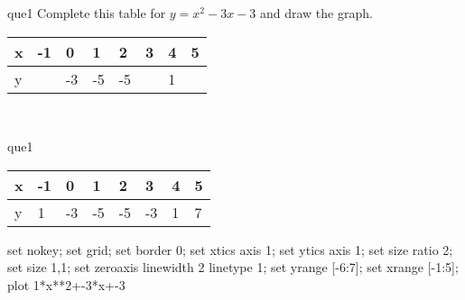 \documentclass[13.5pt, varwidth=true]{beamer}
\begin{document}
\begin{frame}[shrink=19,fragile]
	\begin{beamercolorbox}[rounded=true, left, shadow=true,wd=14.8cm]{que1}
		 Complete this table for $y = x^{2} - 3x - 3$ and draw the graph. \\[0.3cm] \renewcommand{\arraystretch}{1.2}\begin{tabular}{|C|C|C|C|C|C|C|C|} \hline x & -1 & 0 & 1 & 2 & 3 & 4 & 5 \\ \hline y &  & -3 & -5 & -5 &  & 1 & \\ \hline \end{tabular}\\[0.3cm]
	\end{beamercolorbox}
\end{frame}
\begin{frame}[shrink=19,fragile]
	\begin{beamercolorbox}[rounded=true, left, shadow=true,wd=14.8cm]{que1}
		\renewcommand{\arraystretch}{1.2}\begin{tabular}{|C|C|C|C|C|C|C|C|} \hline x & -1 & 0 & 1 & 2 & 3 & 4 & 5 \\ \hline y & 1 & -3 & -5 & -5 & -3 & 1 & 7\\ \hline \end{tabular}\begin{gnuplot}[terminal=pdf] set nokey; set grid; set border 0; set xtics axis 1; set ytics axis 1; set size ratio 2; set size 1,1; set zeroaxis linewidth 2 linetype 1; set yrange [-6:7]; set xrange [-1:5]; plot 1*x**2+-3*x+-3 \end{gnuplot}
	\end{beamercolorbox}
\end{frame}
\end{document}
